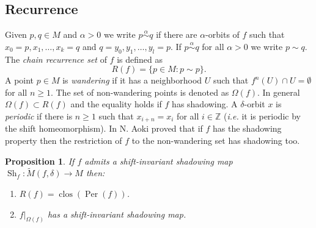 \documentclass[12pt]{amsart}
\DeclareMathOperator{\per}{Per}
\theoremstyle{plain}
\newtheorem{prop}[thm]{Proposition}
\theoremstyle{definition}
\theoremstyle{remark}
\DeclareMathOperator{\clos}{clos}
\DeclareMathOperator{\shm}{Sh}
\newcommand{\Z}{\mathbb Z}
\renewcommand{\epsilon}{\varepsilon}
\newcommand{\tM}{\tilde{M}}
\newcommand{\rojo}[1]{\textcolor{red}{#1}}
\begin{document}
\subsection{Recurrence}
\label{secRecurrence}
Given $p,q\in M$ and $\alpha>0$ we write $p\overset\alpha\sim q$ if there are $\alpha$-orbits of $f$ such that $x_0=p,x_1,\dots,x_k=q$ and $q=y_0,y_1,\dots,y_l=p$.
If $p\overset\alpha\sim q$ for all $\alpha>0$ we write $p\sim q$.
The \textit{chain recurrence set} of $f$ is defined as
\[
R(f)=\{p\in M:p\sim p\}.
\]
A point $p\in M$ is \textit{wandering} if it has a neighborhood $U$ such that $f^n(U)\cap U=\emptyset$ for all $n\geq 1$. The set of non-wandering points is denoted as $\Omega(f)$.
In general $\Omega(f)\subset R(f)$ and the equality holds if $f$ has shadowing.
A $\delta$-orbit $x$ is \textit{periodic} if there is $n\geq 1$ such that $x_{i+n}=x_i$ for all $i\in\Z$ (\textit{i.e.} it is periodic by the shift homeomorphism).
In \cite{Aoki83} N. Aoki proved that if $f$ has the shadowing property then the restriction of $f$ to the non-wandering set has shadowing too.

\begin{prop}
	If $f$ admits a shift-invariant shadowing map $\shm_f\colon \tM(f,\delta)\to M$ then:
	\begin{enumerate}[label=(\alph*)]

		\item\label{thmShmSH-R} $R(f)=\clos(\per(f))$.
		\item\label{thmShmSH-Omega} $f|_{\Omega(f)}$ has a shift-invariant shadowing map.
	\end{enumerate}
\end{prop}
\end{document}
